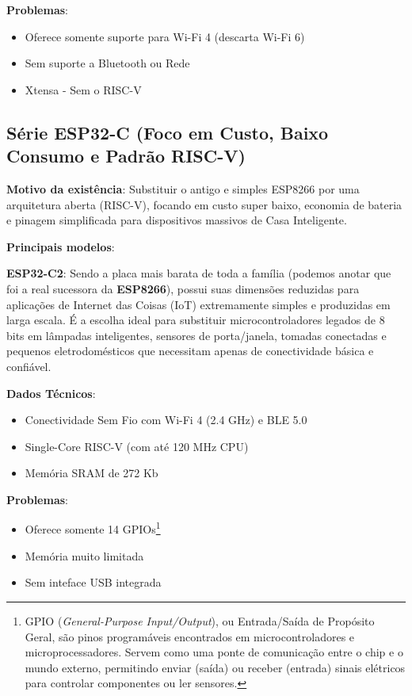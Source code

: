 \documentclass[a4paper,11pt]{article}
\begin{document}
\textbf{Problemas}: \vspace{-1em}
\begin{itemize}[nolistsep]
	\item Oferece somente suporte para Wi-Fi 4 (descarta Wi-Fi 6)
	\item Sem suporte a Bluetooth ou Rede
	\item Xtensa - Sem o RISC-V
\end{itemize}

\subsection{Série ESP32-C (Foco em Custo, Baixo Consumo e Padrão RISC-V)}
\textbf{Motivo da existência}: Substituir o antigo e simples ESP8266 por uma arquitetura aberta (RISC-V), focando em custo super baixo, economia de bateria e pinagem simplificada para dispositivos massivos de Casa Inteligente.

\textbf{Principais modelos}:

\textbf{ESP32-C2}: Sendo a placa mais barata de toda a família (podemos anotar que foi a real sucessora da \textbf{ESP8266}), possui suas dimensões reduzidas para aplicações de Internet das Coisas (IoT) extremamente simples e produzidas em larga escala. É a escolha ideal para substituir microcontroladores legados de 8 bits em lâmpadas inteligentes, sensores de porta/janela, tomadas conectadas e pequenos eletrodomésticos que necessitam apenas de conectividade básica e confiável.

\textbf{Dados Técnicos}: \vspace{-1em}
\begin{itemize}[nolistsep]
	\item Conectividade Sem Fio	com Wi-Fi 4 (2.4 GHz) e BLE 5.0
	\item Single-Core RISC-V (com até 120 MHz CPU)
	\item Memória SRAM de 272 Kb
\end{itemize}

\textbf{Problemas}: \vspace{-1em}
\begin{itemize}[nolistsep]
	\item Oferece somente 14 GPIOs\footnote{GPIO (\textit{General-Purpose Input/Output}), ou Entrada/Saída de Propósito Geral, são pinos programáveis encontrados em microcontroladores e microprocessadores. Servem como uma ponte de comunicação entre o chip e o mundo externo, permitindo enviar (saída) ou receber (entrada) sinais elétricos para controlar componentes ou ler sensores.}
	\item Memória muito limitada
	\item Sem inteface USB integrada
\end{itemize}
\end{document}
